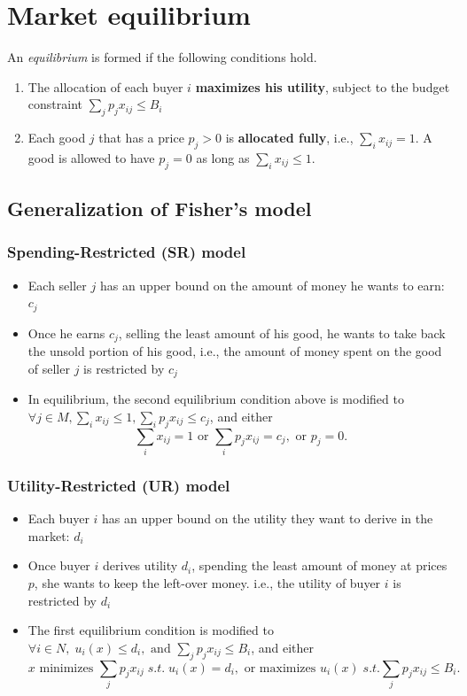 \documentclass[11pt, a4paper]{article}
\begin{document}
\section{Market equilibrium}
An \textit{equilibrium} is formed if the following conditions hold.
\begin{enumerate}
    \item The allocation of each buyer $i$ \textbf{maximizes his utility}, subject to the budget constraint $\sum_j p_j x_{ij}\leq B_i$
    \item Each good $j$ that has a price $p_j>0$ is \textbf{allocated fully}, i.e., $\sum_i x_{ij}=1$. A good is allowed to have $p_j=0$ as long as $\sum_i x_{ij}\leq 1$.
\end{enumerate}
\subsection{Generalization of Fisher's model}
\subsubsection{Spending-Restricted (SR) model}
\begin{itemize}
    \item Each seller $j$ has an upper bound on the amount of money he wants to earn: $c_j$
    \item Once he earns $c_j$, selling the least amount of his good, he wants to take back the unsold portion of his good, i.e., the amount of money spent on the good of seller $j$ is restricted by $c_j$
    \item In equilibrium, the second equilibrium condition above is modified to $\forall j\in M,\sum_i x_{ij}\leq 1,\sum_i p_j x_{ij}\leq c_j$, and either 
    \[\sum_i x_{ij} = 1 \text{ or }\sum_i p_j x_{ij}=c_j, \text{ or } p_j=0. \]
\end{itemize}
\subsubsection{Utility-Restricted (UR) model}
\begin{itemize}
    \item Each buyer $i$ has an upper bound on the utility they want to derive in the market: $d_i$
    \item Once buyer $i$ derives utility $d_i$, spending the least amount of money at prices $p$, she wants to keep the left-over money. i.e., the utility of buyer $i$ is restricted by $d_i$
    \item The first equilibrium condition is modified to $\forall i\in N,\; u_i(x)\leq d_i, \text{ and }\sum_j p_j x_{ij}\leq B_i$, and either 
    \[x\text{ minimizes }\sum_j p_j x_{ij}\; s.t.\; u_i(x)=d_i,\text{ or maximizes }u_i(x)\; s.t. \sum_j p_j x_{ij}\leq B_i.\]
\end{itemize}
\end{document}
